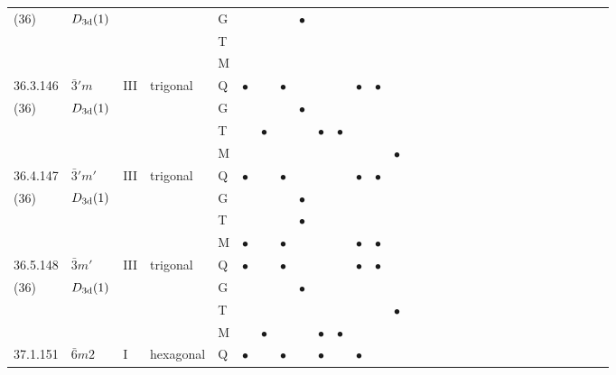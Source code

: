 \documentclass[fleqn,9pt,landscape]{jsarticle}
\begin{document}
\begin{longtable}{lllll|l|l|l|l|l|l|l|l|l|ll|ll|ll|ll|ll|ll|ll|ll}
(36) & $D_{\rm 3d}(1)$ &  &  & G &  &  &  & $\bullet$ &  &  &  &  &  &  &  &  &  &  &  &  &  &  &  &  &  &  &  &  &  \\
 &  &  &  & T &  &  &  &  &  &  &  &  &  &  &  &  &  &  &  &  &  &  &  &  &  &  &  &  &  \\
 &  &  &  & M &  &  &  &  &  &  &  &  &  &  &  &  &  &  &  &  &  &  &  &  &  &  &  &  &  \\ \hline
36.3.146 & \texttt{$\bar{3}'m$} & III & trigonal & Q & $\bullet$ &  & $\bullet$ &  &  &  & $\bullet$ & $\bullet$ &  &  &  &  &  &  &  &  &  &  &  &  &  &  &  &  &  \\
(36) & $D_{\rm 3d}(1)$ &  &  & G &  &  &  & $\bullet$ &  &  &  &  &  &  &  &  &  &  &  &  &  &  &  &  &  &  &  &  &  \\
 &  &  &  & T &  & $\bullet$ &  &  & $\bullet$ & $\bullet$ &  &  &  &  &  &  &  &  &  &  &  &  &  &  &  &  &  &  &  \\
 &  &  &  & M &  &  &  &  &  &  &  &  & $\bullet$ &  &  &  &  &  &  &  &  &  &  &  &  &  &  &  &  \\ \hline
36.4.147 & \texttt{$\bar{3}'m'$} & III & trigonal & Q & $\bullet$ &  & $\bullet$ &  &  &  & $\bullet$ & $\bullet$ &  &  &  &  &  &  &  &  &  &  &  &  &  &  &  &  &  \\
(36) & $D_{\rm 3d}(1)$ &  &  & G &  &  &  & $\bullet$ &  &  &  &  &  &  &  &  &  &  &  &  &  &  &  &  &  &  &  &  &  \\
 &  &  &  & T &  &  &  & $\bullet$ &  &  &  &  &  &  &  &  &  &  &  &  &  &  &  &  &  &  &  &  &  \\
 &  &  &  & M & $\bullet$ &  & $\bullet$ &  &  &  & $\bullet$ & $\bullet$ &  &  &  &  &  &  &  &  &  &  &  &  &  &  &  &  &  \\ \hline
36.5.148 & \texttt{$\bar{3}m'$} & III & trigonal & Q & $\bullet$ &  & $\bullet$ &  &  &  & $\bullet$ & $\bullet$ &  &  &  &  &  &  &  &  &  &  &  &  &  &  &  &  &  \\
(36) & $D_{\rm 3d}(1)$ &  &  & G &  &  &  & $\bullet$ &  &  &  &  &  &  &  &  &  &  &  &  &  &  &  &  &  &  &  &  &  \\
 &  &  &  & T &  &  &  &  &  &  &  &  & $\bullet$ &  &  &  &  &  &  &  &  &  &  &  &  &  &  &  &  \\
 &  &  &  & M &  & $\bullet$ &  &  & $\bullet$ & $\bullet$ &  &  &  &  &  &  &  &  &  &  &  &  &  &  &  &  &  &  &  \\ \hline
37.1.151 & \texttt{$\bar{6}m2$} & I & hexagonal & Q & $\bullet$ &  & $\bullet$ &  & $\bullet$ &  & $\bullet$ &  &  &  &  &  &  &  &  &  &  &  &  &  &  &  &  &  &  \\

\end{longtable}
\end{document}

